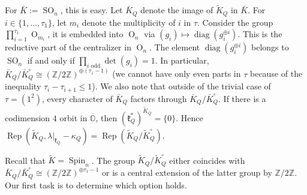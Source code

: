 \documentclass[12pt]{amsart}
\newcommand{\Orb}{\mathbb{O}}
\newcommand{\Z}{\mathbb{Z}}
\newcommand{\kf}{\mathfrak{k}}
\theoremstyle{definition}
\numberwithin{equation}{section}
\begin{document}
For $\bar{K}:=\operatorname{SO}_n$, this is  easy. Let $\bar{K}_Q$ denote the image of $\tilde{K}_Q$ in $\bar{K}$. For $i\in \{1,\ldots,\tau_1\}$, let $m_i$
denote the multiplicity of $i$ in $\tau$. Consider the group $\prod_{i=1}^{\tau_1}
\operatorname{O}_{m_i}$, it is embedded into $\operatorname{O}_n$ via
$(g_i)\mapsto \operatorname{diag}(g_i^{\oplus i})$. This is the reductive part of
the centralizer in $\operatorname{O}_n$. The element  $\operatorname{diag}(g_i^{\oplus i})$
belongs to $\operatorname{SO}_n$ if and only if $\prod_{i\text{ odd}}\det(g_i)=1$.
In particular, $\bar{K}_Q/\bar{K}_Q^\circ\cong (\Z/2\Z)^{\oplus (\tau_1-1)}$ (we cannot have only even
parts in $\tau$ because of the inequality $\tau_i-\tau_{i+1}\leqslant 1$). We also note that outside of the trivial case of $\tau=(1^2)$, every character
of $\bar{K}_Q$ factors through $\bar{K}_Q/\bar{K}_Q^\circ$. If there is a codimension $4$ orbit in
$\overline{\Orb}$, then $(\mathfrak{k}_Q^*)^{\tilde{K}_Q}=\{0\}$.
Hence $\operatorname{Rep}(\tilde{K}_Q,\lambda|_{\kf_Q}-\kappa_Q)=\operatorname{Rep}(\tilde{K}_Q/\tilde{K}_Q^\circ)$.


Recall that $\tilde{K}=\operatorname{Spin}_n$. The group $\tilde{K}_Q/\tilde{K}_Q^\circ$ either coincides with
$\bar{K}_Q/\bar{K}_Q^\circ\cong(\Z/2\Z)^{\oplus \tau_1-1}$ or is a central extension of the latter group by
$\Z/2\Z$. Our first task is to determine which option holds.
\end{document}
